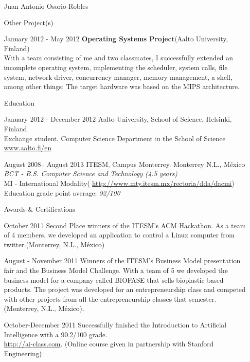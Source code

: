 \documentclass[english,10pt,letterpaper]{article}
\begin{document}
\begin{cv}{Juan Antonio Osorio-Robles}
    \begin{cvlist}{Other Project(s)}
		\item [January 2012 - May 2012]
            \textbf{Operating Systems Project}(Aalto University, Finland)\\
            With a team consisting of me and two classmates, I successfully
            extended an incomplete operating system, implementing the scheduler,
            system calls, file system, network driver, concurrency manager,
            memory management, a shell, among other things; The target hardware
            was based on the MIPS architecture.
	\end{cvlist}

	\begin{cvlist}{Education}
		\item [January 2012 - December 2012]
			Aalto University, School of Science, Helsinki, Finland\\
			Exchange student. Computer Science Department in the School of
            Science\\
			\href{www.aalto.fi/en}{www.aalto.fi/en}

		\item	[August 2008-- August 2013]
			ITESM, Campus Monterrey. Monterrey N.L., M\'{e}xico\\
			\emph{BCT - B.S. Computer Science and Technology (4.5 years)}\\
			MI - International Modality(
            \href{http://www.mty.itesm.mx/rectoria/dda/dacmi}
            {http://www.mty.itesm.mx/rectoria/dda/dacmi})\\
			Education grade point average: \emph{92/100}
	\end{cvlist}

	\begin{cvlist}{Awards \& Certifications}
		\item [October 2011] Second Place winners of the ITESM's ACM Hackathon.
            As a team of 4 members, we developed an application to control a
            Linux computer from twitter.(Monterrey, N.L., M\'{e}xico)
		\item [August - November 2011] Winners of the ITESM's Business Model
            presentation fair and the Business Model Challenge. With a team of
            5 we developed the business model for a company called BIOFASE that
            sells bioplastic-based products. The project was developed for an
            entrepreneurship class and competed with other projects from all
            the entrepreneurship classes that semester.
            (Monterrey, N.L., M\'{e}xico).
		\item [October-December 2011] Successfully finished the Introduction to
            Artificial Intelligence with a 90.2/100 grade. \\
		    \href{http://ai-class.com}{http://ai-class.com}. (Online course
            given in partnership with Stanford Engineering)
	\end{cvlist}



\end{cv}
\end{document}

